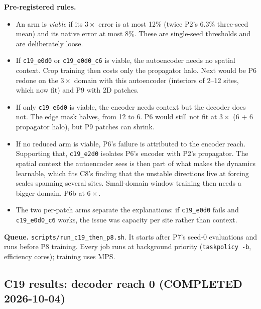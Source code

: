 \documentclass[11pt]{article}
\begin{document}
\textbf{Pre-registered rules.}
\begin{itemize}[leftmargin=*]
\item An arm is \emph{viable} if its $3\times$ error is at most 12\%
  (twice P2's 6.3\% three-seed mean) and its native error at most 8\%.
  These are single-seed thresholds and are deliberately loose.
\item If \texttt{c19\_e0d0} or \texttt{c19\_e0d0\_c6} is viable, the
  autoencoder needs no spatial context. Crop training then costs only
  the propagator halo. Next would be P6 redone on the $3\times$ domain
  with this autoencoder (interiors of 2--12 sites, which now fit) and P9
  with 2D patches.
\item If only \texttt{c19\_e6d0} is viable, the encoder needs context
  but the decoder does not. The edge mask halves, from 12 to 6. P6 would
  still not fit at $3\times$ (6 + 6 propagator halo), but P9 patches can
  shrink.
\item If no reduced arm is viable, P6's failure is attributed to the
  encoder reach. Supporting that, \texttt{c19\_e2d0} isolates P6's
  encoder with P2's propagator. The spatial context the autoencoder sees
  is then part of what makes the dynamics learnable, which fits C8's
  finding that the unstable directions live at forcing scales spanning
  several sites. Small-domain window training then needs a bigger
  domain, P6b at $6\times$.
\item The two per-patch arms separate the explanations: if
  \texttt{c19\_e0d0} fails and \texttt{c19\_e0d0\_c6} works, the issue
  was capacity per site rather than context.
\end{itemize}

\textbf{Queue.} \texttt{scripts/run\_c19\_then\_p8.sh}. It starts
after P7's seed-0 evaluations and runs before P8 training. Every job runs
at background priority (\texttt{taskpolicy -b}, efficiency cores);
training uses MPS.

\subsection{C19 results: decoder reach 0 (COMPLETED 2026-10-04)}
\label{sec:c19_results}
\end{document}
